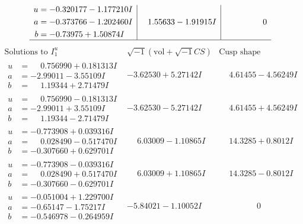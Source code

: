 \documentclass[1p]{elsarticle_modified}
\theoremstyle{definition}
\newcommand{\I}{\sqrt{-1}}
\begin{document}
$$\begin{array}{c|c|c}
\begin{aligned}
u &= -0.320177 - 1.177210 I \\
a &= -0.373766 - 1.202460 I \\
b &= -0.73975 + 1.50874 I\end{aligned}
 & \phantom{-}1.55633 - 1.91915 I & \phantom{-0.000000 } 0\\
 \hline 
 \end{array}$$\newpage$$\begin{array}{c|c|c}  
\text{Solutions to }I^u_{1}& \I (\text{vol} + \sqrt{-1}CS) & \text{Cusp shape}\\
 \hline 
\begin{aligned}
u &= \phantom{-}0.756990 + 0.181313 I \\
a &= -2.99011 - 3.55109 I \\
b &= \phantom{-}1.19344 + 2.71479 I\end{aligned}
 & -3.62530 + 5.27142 I & \phantom{-}4.61455 - 4.56249 I \\ \hline\begin{aligned}
u &= \phantom{-}0.756990 - 0.181313 I \\
a &= -2.99011 + 3.55109 I \\
b &= \phantom{-}1.19344 - 2.71479 I\end{aligned}
 & -3.62530 - 5.27142 I & \phantom{-}4.61455 + 4.56249 I \\ \hline\begin{aligned}
u &= -0.773908 + 0.039316 I \\
a &= \phantom{-}0.028490 - 0.517470 I \\
b &= -0.307660 + 0.629701 I\end{aligned}
 & \phantom{-}6.03009 - 1.10865 I & \phantom{-}14.3285 + 0.8012 I \\ \hline\begin{aligned}
u &= -0.773908 - 0.039316 I \\
a &= \phantom{-}0.028490 + 0.517470 I \\
b &= -0.307660 - 0.629701 I\end{aligned}
 & \phantom{-}6.03009 + 1.10865 I & \phantom{-}14.3285 - 0.8012 I \\ \hline\begin{aligned}
u &= -0.051004 + 1.229700 I \\
a &= -0.65147 - 1.75217 I \\
b &= -0.546978 - 0.264959 I\end{aligned}
 & -5.84021 - 1.10052 I & \phantom{-0.000000 } 0 \\ \hline\begin{aligned}

\end{aligned}
\end{array}$$
\end{document}

